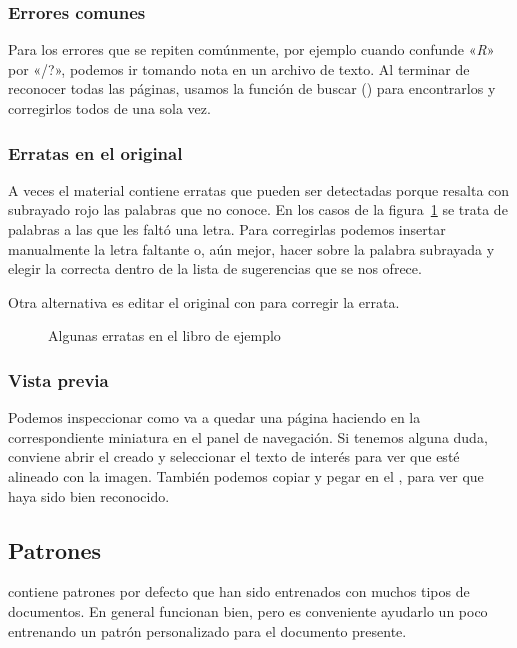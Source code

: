 \documentclass[%
	a5paper,
	10pt,
	twoside,
	openright,
	final,
]{memoir}
\begin{document}
	\subsubsection{Errores comunes} Para los errores que se repiten comúnmente, por ejemplo cuando \abby confunde «\textit{R}» por «/?», podemos ir tomando nota en un archivo de texto. Al terminar de reconocer todas las páginas, usamos la función de buscar () para encontrarlos y corregirlos todos de una sola vez.

	\subsubsection{Erratas en el original} A veces el material contiene erratas que pueden ser detectadas porque \abby resalta con subrayado rojo las palabras que no conoce. En los casos de la figura~\ref{fig:ABBYCorrectionsTypos} se trata de palabras a las que les faltó una letra. Para corregirlas podemos insertar manualmente la letra faltante o, aún mejor, hacer \keys{\rightclick} sobre la palabra subrayada y elegir la correcta dentro de la lista de sugerencias que se nos ofrece.

	Otra alternativa es editar el original con \gimp para corregir la errata.

	\begin{figure}
		\caption{Algunas erratas en el libro de ejemplo\label{fig:ABBYCorrectionsTypos}}
	\end{figure}

	\subsubsection{Vista previa} Podemos inspeccionar como va a quedar una página haciendo  en la correspondiente miniatura en el panel de navegación. Si tenemos alguna duda, conviene abrir el \pdf creado y seleccionar el texto de interés para ver que esté alineado con la imagen. También podemos copiar y pegar en el \notepad, para ver que haya sido bien reconocido.

	\subsection{Patrones} \abby contiene patrones por defecto que han sido entrenados con muchos tipos de documentos. En general funcionan bien, pero es conveniente ayudarlo un poco entrenando un patrón personalizado para el documento presente.
\end{document}

